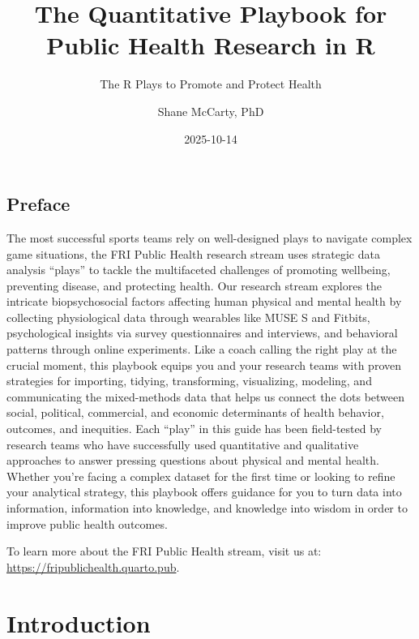\documentclass[
  english,
  letterpaper,
  DIV=11,
  numbers=noendperiod]{scrreprt}
\title{The Quantitative Playbook for Public Health Research in R}
\subtitle{The R Plays to Promote and Protect Health}
\author{Shane McCarty, PhD}
\date{2025-10-14}
\renewcommand*\contentsname{Table of contents}
\newcommand\contentsname{Table of contents}
\begin{document}
\maketitle

\renewcommand*\contentsname{Table of contents}
{
\hypersetup{linkcolor=}
\setcounter{tocdepth}{2}
\tableofcontents
}


\chapter*{Preface}\label{preface}


The most successful sports teams rely on well-designed plays to navigate
complex game situations, the FRI Public Health research stream uses
strategic data analysis ``plays'' to tackle the multifaceted challenges
of promoting wellbeing, preventing disease, and protecting health. Our
research stream explores the intricate biopsychosocial factors affecting
human physical and mental health by collecting physiological data
through wearables like MUSE S and Fitbits, psychological insights via
survey questionnaires and interviews, and behavioral patterns through
online experiments. Like a coach calling the right play at the crucial
moment, this playbook equips you and your research teams with proven
strategies for importing, tidying, transforming, visualizing, modeling,
and communicating the mixed-methods data that helps us connect the dots
between social, political, commercial, and economic determinants of
health behavior, outcomes, and inequities. Each ``play'' in this guide
has been field-tested by research teams who have successfully used
quantitative and qualitative approaches to answer pressing questions
about physical and mental health. Whether you're facing a complex
dataset for the first time or looking to refine your analytical
strategy, this playbook offers guidance for you to turn data into
information, information into knowledge, and knowledge into wisdom in
order to improve public health outcomes.

To learn more about the FRI Public Health stream, visit us at:
\url{https://fripublichealth.quarto.pub}.

\part{Introduction}
\end{document}

